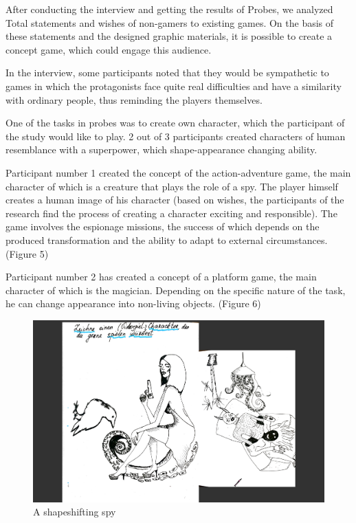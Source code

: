 \documentclass[]{vutinfth}
\begin{document}
After conducting the interview and getting the results of Probes, we
analyzed Total statements and wishes of non-gamers to existing games. On
the basis of these statements and the designed graphic materials, it is
possible to create a concept game, which could engage this audience.

In the interview, some participants noted that they would be sympathetic
to games in which the protagonists face quite real difficulties and have
a similarity with ordinary people, thus reminding the players
themselves.

One of the tasks in probes was to create own character, which the
participant of the study would like to play. 2 out of 3 participants
created characters of human resemblance with a superpower, which
shape-appearance changing ability.

Participant number 1 created the concept of the action-adventure game,
the main character of which is a creature that plays the role of a spy.
The player himself creates a human image of his character (based on
wishes, the participants of the research find the process of creating a
character exciting and responsible). The game involves the espionage
missions, the success of which depends on the produced transformation
and the ability to adapt to external circumstances. (Figure 5)

Participant number 2 has created a concept of a platform game, the main
character of which is the magician. Depending on the specific nature of
the task, he can change appearance into non-living objects. (Figure 6)

\begin{figure}
\centering
\includegraphics{images/spy.png}
\caption{A shapeshifting spy}
\end{figure}
\end{document}
